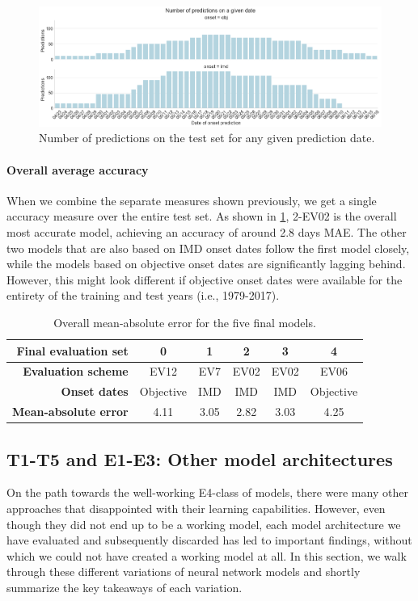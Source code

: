 \begin{figure}[h!]
  \centering
  \includegraphics[width=\linewidth]{./99_appendix/img/prediction_accuracy_dates_dist}
  \caption{Number of predictions on the test set for any given prediction date.}
  \label{fig:e4_prediction_dist}
\end{figure}

\paragraph{Overall average accuracy}
When we combine the separate measures shown previously, we get a single accuracy measure over the entire test set. As shown in \cref{tab:overall_average}, 2-EV02 is the overall most accurate model, achieving an accuracy of around 2.8 days MAE. The other two models that are also based on IMD onset dates follow the first model closely, while the models based on objective onset dates are significantly lagging behind. However, this might look different if objective onset dates were available for the entirety of the training and test years (i.e., 1979-2017).

\begin{table}[h!]
  \centering
  \begin{tabular}{rccccc}
    \toprule
    \textbf{Final evaluation set} & \textbf{0} & \textbf{1} & \textbf{2} & \textbf{3} & \textbf{4} \\
    \midrule
    \textbf{Evaluation scheme} & EV12 & EV7 & EV02 & EV02 & EV06 \\
    \textbf{Onset dates} & Objective & IMD & IMD & IMD & Objective \\
    \midrule
    \textbf{Mean-absolute error} & 4.11 & 3.05 & 2.82 & 3.03 & 4.25 \\
    \bottomrule
  \end{tabular}
  \caption{Overall mean-absolute error for the five final models.}
  \label{tab:overall_average}
\end{table}

\subsection{T1-T5 and E1-E3: Other model architectures}
On the path towards the well-working E4-class of models, there were many other approaches that disappointed with their learning capabilities. However, even though they did not end up to be a working model, each model architecture we have evaluated and subsequently discarded has led to important findings, without which we could not have created a working model at all. In this section, we walk through these different variations of neural network models and shortly summarize the key takeaways of each variation.

